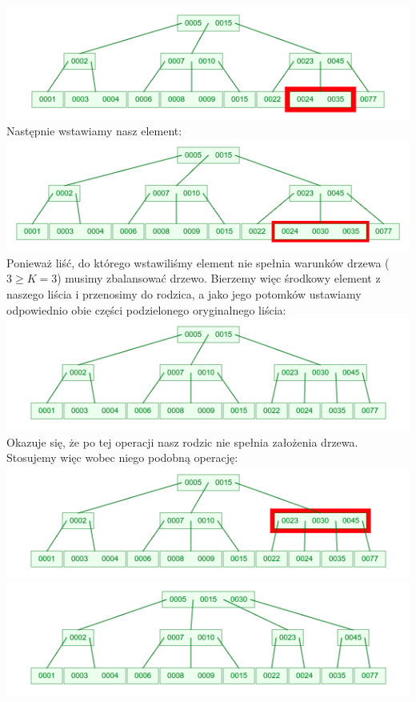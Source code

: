 \documentclass[12pt]{article}
\begin{document}
	\includegraphics[width=\linewidth]{graphics/b-trees/insert/find-05.png} \\

	\noindent Następnie wstawiamy nasz element: \\
	\includegraphics[width=\linewidth]{graphics/b-trees/insert/insert.png} \\

	\noindent Ponieważ liść, do którego wstawiliśmy element nie spełnia warunków drzewa ($3 \geq K=3$) musimy zbalansować drzewo. Bierzemy więc środkowy element z naszego liścia i przenosimy do rodzica, a jako jego potomków ustawiamy odpowiednio obie części podzielonego oryginalnego liścia: \\
	\includegraphics[width=\linewidth]{graphics/b-trees/insert/rebalance-01.png} \\

	\noindent Okazuje się, że po tej operacji nasz rodzic nie spełnia założenia drzewa. Stosujemy więc wobec niego podobną operację: \\
	\includegraphics[width=\linewidth]{graphics/b-trees/insert/rebalance-02.png} \\
	\includegraphics[width=\linewidth]{graphics/b-trees/insert/rebalance-03.png} \\
\end{document}
